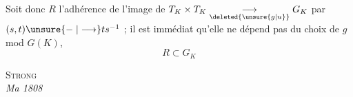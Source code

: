 Soit donc $R$ \unsure{:} l'adhérence de l'image de $T_K\times T_K\underset{\deleted{\unsure{g|u}}}{\longrightarrow}G_K$ par $(s,t)\unsure{\mathrel{-}|\longrightarrow}ts^{-1}$ ; il est immédiat qu'elle ne dépend pas du choix de $g$ mod $G(K)$, 
\[
\boxed{R\subset G_K}
\]
{\centering \textsc{ Strong}\\
\textit{Ma 1808}\par}

